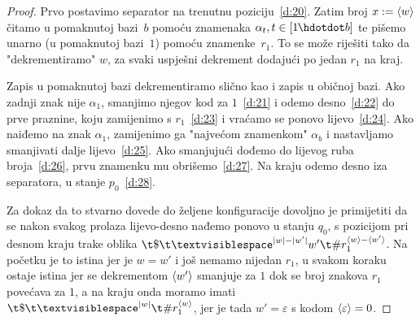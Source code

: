 \begin{proof}
	Prvo postavimo separator na trenutnu poziciju~\eqref{d:20}. Zatim broj $x:=\langle w\rangle$ čitamo u pomaknutoj bazi~$b$ pomoću znamenaka $\alpha_t,t\in[1\mspace{-1mu}\dd b]$ te pišemo unarno (u pomaknutoj bazi~$1$) pomoću znamenke~$r_1$. To se može riješiti tako da "dekrementiramo" $w$, za svaki uspješni dekrement dodajući po jedan $r_1$ na kraj.

Zapis u pomaknutoj bazi dekrementiramo slično kao i zapis u običnoj bazi. Ako zadnji znak nije $\alpha_1$, smanjimo njegov kod za $1$~\eqref{d:21} i odemo desno~\eqref{d:22} do prve praznine, koju zamijenimo s $r_1$~\eqref{d:23} i vraćamo se ponovo lijevo~\eqref{d:24}. Ako naiđemo na znak $\alpha_1$, zamijenimo ga "najvećom znamenkom" $\alpha_b$ i nastavljamo smanjivati dalje lijevo~\eqref{d:25}. Ako smanjujući dođemo do lijevog ruba broja~\eqref{d:26}, prvu znamenku mu obrišemo~\eqref{d:27}. %
Na kraju odemo desno iza separatora, u stanje $p_0$~\eqref{d:28}.

Za dokaz da to stvarno dovede do željene konfiguracije dovoljno je primijetiti da se nakon svakog prolaza lijevo-desno  nađemo ponovo u stanju $q_0$, s pozicijom pri desnom kraju trake oblika $\t\$\bl^{\dulj w-\dulj{w'}}w'\t\#r_1^{\kr w-\kr{w'}}$. Na početku je to istina jer je $w=w'$ i još nemamo nijedan $r_1$, u svakom koraku ostaje istina jer se dekrementom $\langle w'\rangle$ smanjuje za $1$ dok se broj znakova $r_1$ povećava za $1$, a na kraju onda moramo imati $\t\$\bl^{\dulj w}\t\#r_1^{\kr w}$, jer je tada $w'=\varepsilon$ s kodom $\langle\varepsilon\rangle=0$.
\end{proof}

